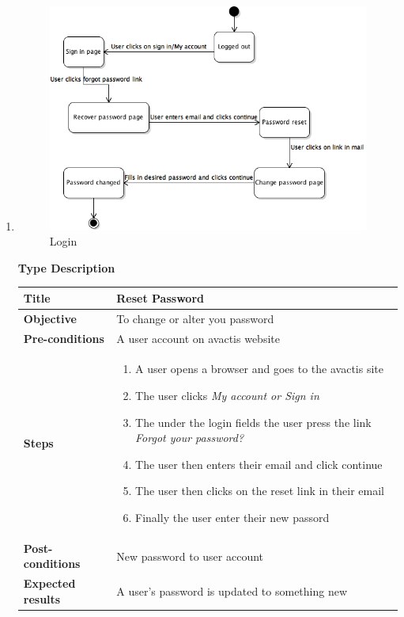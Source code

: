 \documentclass[UKenglish,12pt]{article}
\begin{document}
\begin{enumerate}
\item
\begin{figure}[!h]
\centering
\includegraphics[scale=0.7,keepaspectratio]{Images/ResetPassword.png}
\caption{Login}
\end{figure}
\newpage
\textbf{\hspace{0.3cm}Type\hspace{4.4cm} Description}
\newline \vspace{0.2cm}
\begin{tabular}{| p{5cm} | p{10cm} | }
	\hline
	 \textbf{Title} & Reset Password\\ \hline
	 \textbf{Objective} & To change or alter you password\\ \hline
	 \textbf{Pre-conditions} & A user account on avactis website\\ \hline
	 \textbf{Steps} & \begin{enumerate} \item A user opens a browser and goes to the avactis site \item The user clicks \textit{My account or Sign in} \item The under the login fields the user press the link \textit{Forgot your password?} \item The user then enters their email and click continue \item The user then clicks on the reset link in their email \item Finally the user enter their new passord \end{enumerate} \\ \hline
	 \textbf{Post-conditions} & New password to user account\\ \hline
	 \textbf{Expected results} & A user's password is updated to something new \\ 
	 \hline
\end{tabular} %



\end{enumerate}
\end{document}
